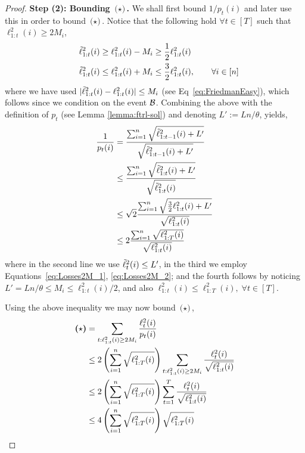 \begin{proof}
\textbf{Step (2): Bounding  $\textbf{($\star$)}$.}
We shall first bound $1/p_t(i)$ and later use this in order to bound $\textbf{($\star$)}$. Notice that the following hold $\forall t\in[T]$ such that $ \ell_{1:t}^2(i) \geq 2M_i$, 
\begin{align}
&\quad \tilde{\ell}_{1:t}^2(i)  \geq \ell_{1:t}^2(i) -M_i \geq \frac{1}{2} \ell_{1:t}^2(i)  \label{eq:Losses2M_1}\\
&\quad \tilde{\ell}_{1:t}^2(i)  \leq \ell_{1:t}^2(i) +M_i \leq \frac{3}{2} \ell_{1:t}^2(i), \qquad \forall i\in[n]  \label{eq:Losses2M_2}
\end{align}
where  we have used $ | \tilde{\ell}_{1:t}^2(i) - \ell_{1:t}^2(i) |\leq M_i$ (see Eq~\eqref{eq:FriedmanEasy}), which follows since we condition on the event $\mathcal{B}$.
Combining the above with the definition of $p_t$ (see Lemma \ref{lemma:ftrl-sol}) and denoting $L' := Ln/\theta$, yields,
\begin{align*}
\frac{1}{p_t(i)} 
&=
\frac{\sum_{i=1}^n \sqrt{\tilde{\ell}_{1:t-1}^2(i) + L'}}{\sqrt{\tilde{\ell}_{1:t-1}^2(i) + L'}} \\
&\leq
\frac{\sum_{i=1}^n \sqrt{\tilde{\ell}_{1:t}^2(i) + L'}}{\sqrt{\tilde{\ell}_{1:t}^2(i) }} \\
&\leq
\sqrt{2}\frac{\sum_{i=1}^n \sqrt{\frac{3}{2}\ell_{1:t}^2(i) + L'}}{\sqrt{\ell_{1:t}^2(i) }} \\
&\leq
2\frac{\sum_{i=1}^n \sqrt{\ell_{1:T}^2(i) }}{\sqrt{\ell_{1:t}^2(i) }} 
\end{align*}
where in the second line we use $\tilde{\ell}_t^2(i) \leq L'$, in the third we employ Equations~\eqref{eq:Losses2M_1}, \eqref{eq:Losses2M_2};  and  the fourth follows by  noticing $L' = Ln/\theta \leq M_i \leq \ell_{1:t}^2(i)/2$, and also $\ell_{1:t}^2(i)\leq \ell_{1:T}^2(i),\;\forall t\in[T]$.

Using the above inequality we may now bound $\textbf{($\star$)}$,
\begin{align} \label{eq:BoundStar}
\textbf{($\star$)} 
&= 
\sum_{t: \ell_{1:t}^2(i) \geq 2M_i} \frac{\ell_t^2(i)}{p_t(i)}  \nonumber\\
&\leq 
2\left( \sum_{i=1}^n \sqrt{\ell_{1:T}^2(i)}\right)  \sum_{t: \ell_{1:t}^2(i) \geq 2M_i} \frac{\ell_t^2(i)}{\sqrt{\ell_{1:t}^2(i)} }  \nonumber\\
&\leq 
2\left( \sum_{i=1}^n \sqrt{\ell_{1:T}^2(i)}\right)  \sum_{t=1}^T \frac{\ell_t^2(i)}{\sqrt{\ell_{1:t}^2(i)} }  \nonumber\\
&\leq
4 \left( \sum_{i=1}^n \sqrt{\ell_{1:T}^2(i)}\right)  \sqrt{\ell_{1:T}^2(i)} 
\end{align}


\end{proof}
